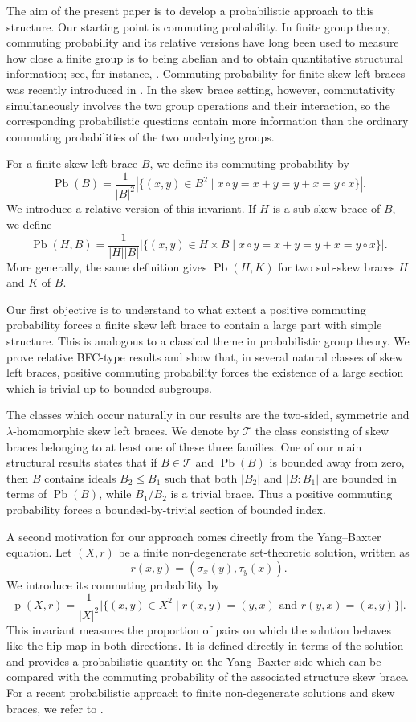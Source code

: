 \documentclass[11pt, oneside]{amsart}
\numberwithin{equation}{section}
\theoremstyle{plain}
\theoremstyle{definition}
\newcommand{\Pb}{\operatorname{Pb} }
\begin{document}
The aim of the present paper is to develop a probabilistic approach to this structure. Our starting point is commuting probability. In finite group theory, commuting probability and its relative versions have long been used to measure how close a finite group is to being abelian and to obtain quantitative structural information; see, for instance, \cite{ET68,WHG73,ERL07,DS22}. Commuting probability for finite skew left braces was recently introduced in \cite{MY26}. In the skew brace setting, however, commutativity simultaneously involves the two group operations and their interaction, so the corresponding probabilistic questions contain more information than the ordinary commuting probabilities of the two underlying groups.

For a finite skew left brace $B$, we define its commuting probability by
$$
\Pb(B)=\frac{1}{|B|^2}
|\{(x,y)\in B^2\mid x\circ y=x+y=y+x=y\circ x\}|.
$$
We introduce a relative version of this invariant. If $H$ is a sub-skew brace of $B$, we define
$$
\Pb(H,B)=\frac{1}{|H||B|}
|\{(x,y)\in H\times B\mid x\circ y=x+y=y+x=y\circ x\}|.
$$
More generally, the same definition gives $\Pb(H,K)$ for two sub-skew braces $H$ and $K$ of $B$.

Our first objective is to understand to what extent a positive commuting probability forces a finite skew left brace to contain a large part with simple structure. This is analogous to a classical theme in probabilistic group theory. We prove relative BFC-type results and show that, in several natural classes of skew left braces, positive commuting probability forces the existence of a large section which is trivial up to bounded subgroups.

The classes which occur naturally in our results are the two-sided, symmetric and $\lambda$-homomorphic skew left braces. We denote by $\mathcal T$ the class consisting of skew braces belonging to at least one of these three families. One of our main structural results states that if $B\in\mathcal T$ and $\Pb(B)$ is bounded away from zero, then $B$ contains ideals $B_2\leqslant B_1$ such that both $|B_2|$ and $|B:B_1|$ are bounded in terms of $\Pb(B)$, while $B_1/B_2$ is a trivial brace. Thus a positive commuting probability forces a bounded-by-trivial section of bounded index.

A second motivation for our approach comes directly from the Yang--Baxter equation. Let $(X,r)$ be a finite non-degenerate set-theoretic solution, written as
$$
r(x,y)=(\sigma_x(y),\tau_y(x)).
$$
We introduce its commuting probability by
$$
\operatorname{p}(X,r)
=
\frac{1}{|X|^2}
\big|\{(x,y)\in X^2\mid r(x,y)=(y,x)\text{ and }r(y,x)=(x,y)\}\big|.
$$
This invariant measures the proportion of pairs on which the solution behaves like the flip map in both directions. It is defined directly in terms of the solution and provides a probabilistic quantity on the Yang--Baxter side which can be compared with the commuting probability of the associated structure skew brace. For a recent probabilistic approach to finite non-degenerate solutions and skew braces, we refer to \cite{FMT26}.
\end{document}
